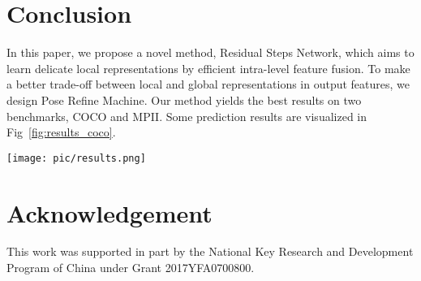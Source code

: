\documentclass[runningheads]{llncs}
\begin{document}
\begin{table}[tp]
  \tiny

  \centering
  \caption{PCKh@0.5 results on MPII test dataset.}
  
  \label{tb:mpii}
\end{table} 

\section{Conclusion}
In this paper, we propose a novel method, Residual Steps Network, which aims to learn delicate local representations by efficient intra-level feature fusion. To make a better trade-off between local and global representations in output features, we design Pose Refine Machine. Our method yields the best results on two benchmarks, COCO and MPII. Some prediction results are visualized in Fig~\ref{fig:results_coco}. 

\begin{figure*}[h]
 \centering


 \texttt{[image: pic/results.png]} \caption{Prediction results on COCO (top line) and MPII (bottom line) val sets. } \label{fig:results_coco} \end{figure*}





\section{Acknowledgement}
This work was supported in part by the National Key Research and Development Program of China under Grant 2017YFA0700800.


\clearpage


\end{document}
